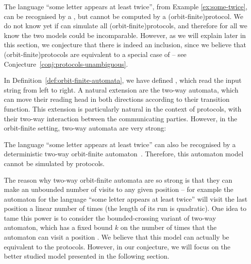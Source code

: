 \begin{myexample}
     \label{ex:protocol-not-nofa}  
    The language ``some letter appears at least twice'', from Example
    \ref{ex:some-twice}, can be recognised by a , but cannot be computed by a \kl(orbit-finite){protocol}.
    We do not know yet if
     can simulate all \kl(orbit-finite){protocols}, 
    and therefore for
    all we know the two models could be incomparable. However, as we will
    explain later in this section, we conjecture that there is indeed an
    inclusion, since we believe that \kl(orbit-finite){protocols}
    are equivalent to a special case
    of  -- see
    Conjecture~\ref{conj:protocols-unambiguous}.
\end{myexample}

In Definition~\ref{def:orbit-finite-automata}, we have defined , which read the input string from left to right. A
natural extension are the two-way automata, which can move their reading head
in both directions according to their transition function. This extension is
particularly natural in the context of protocols, with their two-way
interaction between the communicating parties. However, in the orbit-finite
setting, two-way automata are very strong:

\begin{myexample}\label{ex:protocol-not-2dofa}
    The language ``some letter appears at least twice'' can also be recognised
    by a deterministic two-way orbit-finite automaton~\cite[Example
    18]{bojanczyk_slightly}. Therefore, this automaton model cannot be
    simulated by protocols.

    The reason why two-way orbit-finite automata are so strong is that they can
    make an unbounded number of visits to any given position -- for example the
    automaton for the language ``some letter appears at least twice'' will
    visit the last position a linear number of times (the length of its run is
    quadratic). One idea to tame this power is to consider the bounded-crossing
    variant of two-way automaton, which has a fixed bound $k$ on the number of
    times that the automaton can visit a position \cite[p.~92]{neven2003power}.
    We believe that this model can actually be equivalent to the protocols.
    However, in our conjecture, we will focus on the better studied model
    presented in the following section.
\end{myexample}

